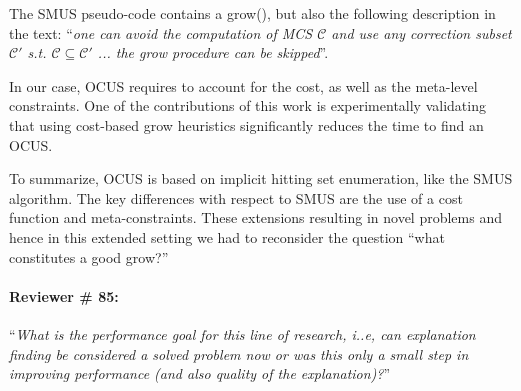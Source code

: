 \documentclass{article}
\begin{document}
The SMUS pseudo-code contains a grow(), but also the following description in the text: ``\emph{one can avoid the computation of MCS $\mathcal{C}$ and use any correction subset $\mathcal{C}'$ s.t. $\mathcal{C} \subseteq \mathcal{C}'$ ... the grow procedure can be skipped}''.

In our case, OCUS requires to account for the cost, as well as the meta-level constraints. One of the contributions of this work is experimentally validating that using cost-based grow heuristics significantly reduces the time to find an OCUS.

To summarize, OCUS is based on implicit hitting set enumeration, like the SMUS algorithm. The key differences with respect to SMUS are the use of a cost function and meta-constraints. These extensions resulting in novel problems and hence in this extended setting we had to reconsider the question ``what constitutes a good grow?''

\paragraph{Reviewer \# 85:}``\textit{What is the performance goal for this line of research, i..e, can explanation finding be considered a solved problem now or was this only a small step in improving performance (and also quality of the explanation)?}''
\end{document}
